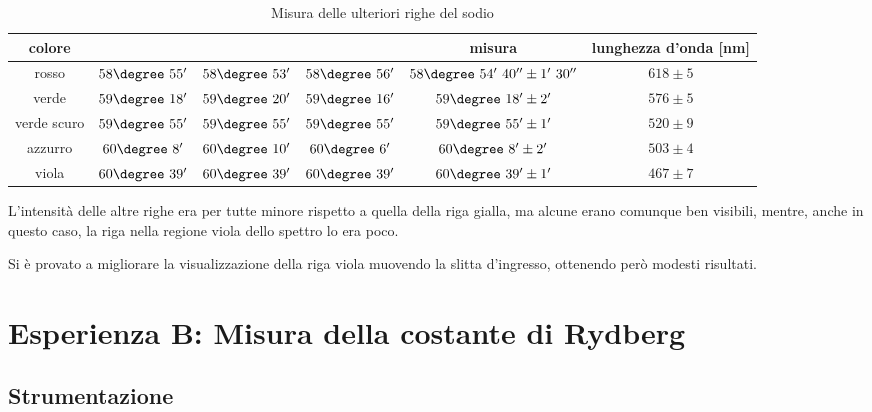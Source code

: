 \documentclass[a4paper,10pt]{article}
\begin{document}
{{{{{{\begin{table}[H]
	\centering
	\begin{tabular}{c|c|c|c|c|c}
		colore &	&	&	& misura & lunghezza d'onda [nm]\\
		\hline
		rosso &	$58\degree~55'$ & $58\degree~53'$ & $58\degree~56'$ & $58\degree~54'~40'' \pm 1'~30''$ & $618 \pm 5$\\
		verde & $59\degree~18'$ & $59\degree~20'$ & $59\degree~16'$ & $59\degree~18' \pm 2'$  & $576 \pm 5$\\
		verde scuro & $59\degree~55'$ & $59\degree~55'$ & $59\degree~55'$ & $59\degree~55' \pm 1'$ & $520 \pm 9$\\
		azzurro & $60\degree~8'$ & $60\degree~10'$ & $60\degree~6'$ & $60\degree~8' \pm 2'$& $503 \pm 4$\\
		viola & $60\degree~39'$ & $60\degree~39'$ & $60\degree~39'$ & $60\degree~39' \pm 1'$ & $467 \pm 7$\\	
	\end{tabular}
	\caption{Misura delle ulteriori righe del sodio}
	\label{tab:moreNa}
\end{table}

L'intensità delle altre righe era per tutte minore rispetto a quella della riga gialla, ma alcune erano comunque ben visibili, mentre, anche in questo caso, la riga nella regione viola dello spettro lo era poco.

Si è provato a migliorare la visualizzazione della riga viola muovendo la slitta d'ingresso, ottenendo però modesti risultati.

\section{Esperienza B: Misura della costante di Rydberg}

\subsection{Strumentazione}

}}}}}}
\end{document}
